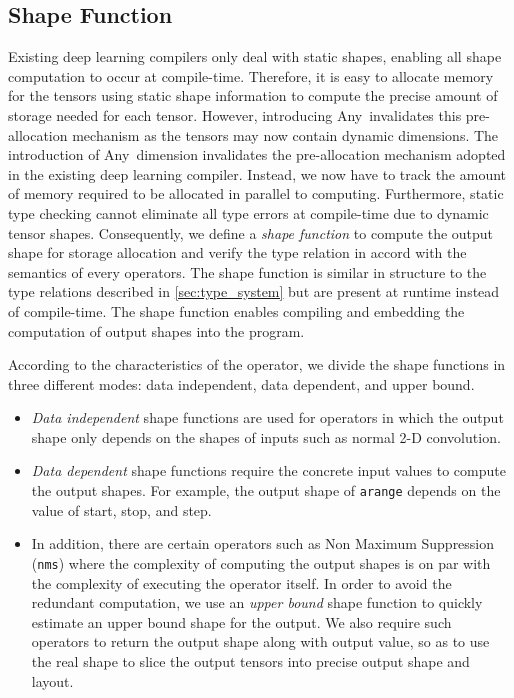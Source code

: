 \subsection{Shape Function}
\label{sec:type_systemTech:shape-func}
Existing deep learning compilers only deal with static shapes,
  enabling all shape computation to occur at compile-time.
Therefore, it is easy to allocate memory for the tensors
  using static shape information to compute the precise amount of storage needed for each tensor.
However, introducing Any~invalidates this pre-allocation
  mechanism as the tensors may now contain dynamic dimensions.
The introduction of Any~dimension invalidates the pre-allocation
  mechanism adopted in the existing deep learning compiler.
Instead, we now have to track the amount of memory required to be allocated in parallel to computing.
Furthermore, static type checking cannot eliminate all
  type errors at compile-time due to dynamic tensor shapes.
Consequently, we define a {\em shape function} to compute the output shape
  for storage allocation and verify the type relation in accord with the semantics of every operators.
The shape function is similar in structure to the type relations described in
  \ref{sec:type_system} but are present at runtime instead of compile-time.
The shape function enables compiling and embedding the computation of output
  shapes into the program.

According to the characteristics of the operator, we divide the shape functions
  in three different modes: data independent, data dependent, and upper bound.
\begin{itemize}
  \item {\em Data independent} shape functions are used for operators in which the output shape
        only depends on the shapes of inputs such as normal 2-D convolution.
  \item {\em Data dependent} shape functions require the concrete input values to compute the output shapes.
        For example, the output shape of \texttt{arange} depends on the value of start, stop, and step.
  \item In addition, there are certain operators such as Non Maximum Suppression (\texttt{nms}) where the
        complexity of computing the output shapes is on par with the complexity of executing the operator itself.
  In order to avoid the redundant computation, we use an {\em upper bound} shape function to quickly estimate an upper bound shape for the output.
  We also require such operators to return the output shape along with output value, so as to use the real shape to slice the output tensors into precise output shape and layout.
\end{itemize}


